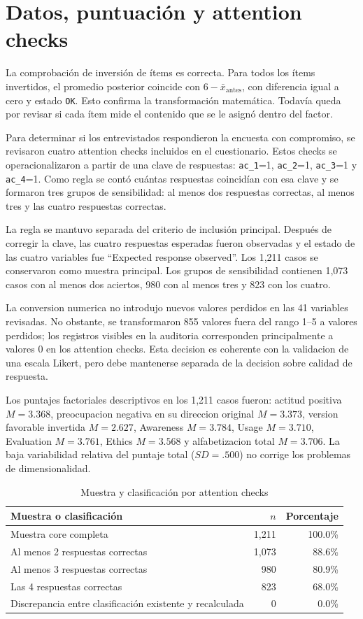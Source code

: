 \documentclass[11pt,a4paper]{article}
\begin{document}
\section{Datos, puntuación y attention checks}

La comprobación de inversión de ítems es correcta. Para todos los ítems invertidos, el promedio posterior coincide con $6 - \bar{x}_{\mathrm{antes}}$, con diferencia igual a cero y estado \texttt{OK}. Esto confirma la transformación matemática. Todavía queda por revisar si cada ítem mide el contenido que se le asignó dentro del factor.

Para determinar si los entrevistados respondieron la encuesta con compromiso, se revisaron cuatro attention checks incluidos en el cuestionario. Estos checks se operacionalizaron a partir de una clave de respuestas: \texttt{ac\_1}=1, \texttt{ac\_2}=1, \texttt{ac\_3}=1 y \texttt{ac\_4}=1. Como regla se contó cuántas respuestas coincidían con esa clave y se formaron tres grupos de sensibilidad: al menos dos respuestas correctas, al menos tres y las cuatro respuestas correctas.

La regla se mantuvo separada del criterio de inclusión principal. Después de corregir la clave, las cuatro respuestas esperadas fueron observadas y el estado de las cuatro variables fue ``Expected response observed''. Los 1,211 casos se conservaron como muestra principal. Los grupos de sensibilidad contienen 1,073 casos con al menos dos aciertos, 980 con al menos tres y 823 con los cuatro.

La conversion numerica no introdujo nuevos valores perdidos en las 41 variables revisadas. No obstante, se transformaron 855 valores fuera del rango 1--5 a valores perdidos; los registros visibles en la auditoria corresponden principalmente a valores 0 en los attention checks. Esta decision es coherente con la validacion de una escala Likert, pero debe mantenerse separada de la decision sobre calidad de respuesta.

Los puntajes factoriales descriptivos en los 1,211 casos fueron: actitud positiva $M=3.368$, preocupacion negativa en su direccion original $M=3.373$, version favorable invertida $M=2.627$, Awareness $M=3.784$, Usage $M=3.710$, Evaluation $M=3.761$, Ethics $M=3.568$ y alfabetizacion total $M=3.706$. La baja variabilidad relativa del puntaje total ($SD=.500$) no corrige los problemas de dimensionalidad.

\begin{table}[ht]
\centering
\caption{Muestra y clasificación por attention checks}
\begin{tabular}{lrr}
\toprule
Muestra o clasificación & $n$ & Porcentaje \\
\midrule
Muestra core completa & 1,211 & 100.0\% \\
Al menos 2 respuestas correctas & 1,073 & 88.6\% \\
Al menos 3 respuestas correctas & 980 & 80.9\% \\
Las 4 respuestas correctas & 823 & 68.0\% \\
Discrepancia entre clasificación existente y recalculada & 0 & 0.0\% \\
\bottomrule
\end{tabular}
\end{table}
\end{document}
